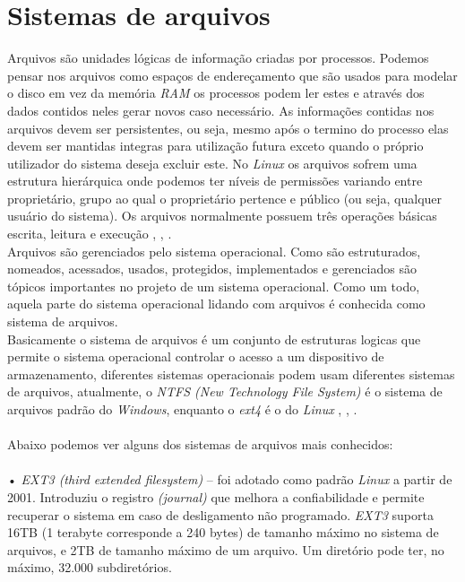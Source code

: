 \chapter{Sistemas de arquivos}\label{cap:SistemasArquivos}

Arquivos são unidades lógicas de informação criadas por processos. Podemos pensar nos arquivos como espaços de endereçamento que são usados para modelar o disco em vez da memória \emph{RAM} os processos podem ler estes e através dos dados contidos neles gerar novos caso necessário. As informações contidas nos arquivos devem ser persistentes, ou seja, mesmo após o termino do processo elas devem ser mantidas integras para utilização futura exceto quando o próprio utilizador do sistema deseja excluir este. No \emph{Linux} os arquivos sofrem uma estrutura hierárquica onde podemos ter níveis de permissões variando entre proprietário, grupo ao qual o proprietário pertence e público (ou seja, qualquer usuário do sistema). Os arquivos normalmente possuem três operações básicas escrita, leitura e execução \cite{Morimoto2011}, \cite{guialinux2020}, \cite{luciano2015}.\\
Arquivos são gerenciados pelo sistema operacional. Como são estruturados, nomeados, acessados, usados, protegidos, implementados e gerenciados são tópicos importantes no projeto de um sistema operacional. Como um todo, aquela parte do sistema operacional lidando com arquivos é conhecida como sistema de arquivos.\\
Basicamente o sistema de arquivos é um conjunto de estruturas logicas que permite o sistema operacional controlar o acesso a um dispositivo de armazenamento, diferentes sistemas operacionais podem usam diferentes sistemas de arquivos, atualmente, o \emph{NTFS (New Technology File System)} é o sistema de arquivos padrão do \emph{Windows}, enquanto o \emph{ext4} é o do \emph{Linux} \cite{Morimoto2011}, \cite{guialinux2020}, \cite{luciano2015}.\\
\\Abaixo podemos ver alguns dos sistemas de arquivos mais conhecidos:\\
\\•	\emph{EXT3 (third extended filesystem)} – foi adotado como padrão \emph{Linux} a partir de 2001. Introduziu o registro \emph{(journal)} que melhora a confiabilidade e permite recuperar o sistema em caso de desligamento não programado. \emph{EXT3} suporta 16TB (1 terabyte corresponde a 240 bytes) de tamanho máximo no sistema de arquivos, e 2TB de tamanho máximo de um arquivo. Um diretório pode ter, no máximo, 32.000 subdiretórios.\\

